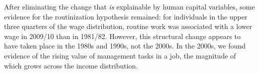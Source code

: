 After eliminating the change that {\em is} explainable by human capital variables, some evidence for the routinization hypothesis remained: for individuals in the upper three quarters of the wage distribution, routine work was associated with a lower wage in 2009/10 than in 1981/82. However, this structural change appears to have taken place in the 1980s and 1990s, not the 2000s. In the 2000s, we found evidence of the rising value of management tasks in a job, the magnitude of which grows across the income distribution. 


